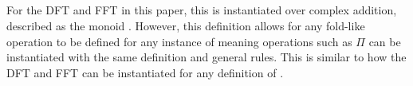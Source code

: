 \begin{AgdaMultiCode}
\begin{code}[hide]
\\
%
\>[2]\AgdaComment{----------------------}\<%
\\
\>[0]\<%
\end{code}
\begin{code}%
\>[0][@{}l@{\AgdaIndent{1}}]%
\>[2]\AgdaSpace{}%
\AgdaSymbol{:}\AgdaSpace{}%
\AgdaSymbol{(}\AgdaSpace{}%
\AgdaSymbol{:}\AgdaSpace{}%
\AgdaSpace{}%
\AgdaSymbol{(}\AgdaSpace{}%
\AgdaSymbol{)}\AgdaSpace{}%
\AgdaSymbol{)}\AgdaSpace{}%
\AgdaSpace{}%
\<%
\\
%
\>[2]\AgdaSpace{}%
\AgdaSymbol{\{}\AgdaSymbol{\}}%
\>[15]\AgdaSpace{}%
\AgdaSymbol{=}\AgdaSpace{}%
\<%
\\
%
\>[2]\AgdaSpace{}%
\AgdaSymbol{\{}\AgdaSpace{}%
\AgdaSymbol{\}}%
\>[15]\AgdaSpace{}%
\AgdaSymbol{=}\AgdaSpace{}%
\AgdaSymbol{(}\AgdaSpace{}%
\AgdaSymbol{)}\AgdaSpace{}%
\AgdaSpace{}%
\AgdaSymbol{(}\AgdaSpace{}%
\AgdaSpace{}%
\AgdaSymbol{)}\AgdaSpace{}%
\<%
\end{code}
\end{AgdaMultiCode}
For the DFT and FFT in this paper, this is instantiated over complex addition,
described as the monoid .
However, this definition allows for any fold-like operation to be defined for 
any instance of  meaning operations such as $\Pi$ can be 
instantiated with the same definition and general rules.
This is similar to how the DFT and FFT can be instantiated for any definition of
.


